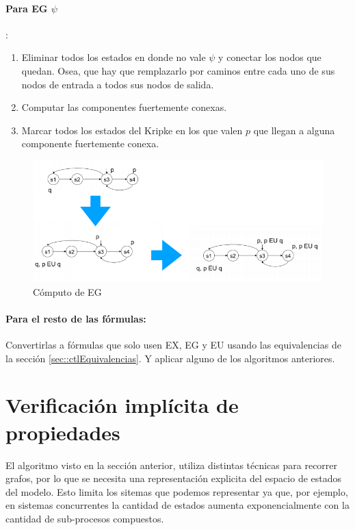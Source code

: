 \paragraph{Para EG $\psi$}: 
\begin{enumerate}
\item Eliminar todos los estados en donde no vale $\psi$ y conectar los nodos que quedan. Osea, que hay que remplazarlo por caminos entre cada uno de sus nodos de entrada a todos sus nodos de salida.
\item Computar las componentes fuertemente conexas.
\item Marcar todos los estados del Kripke en los que valen $p$ que llegan a alguna componente fuertemente conexa.
\end{enumerate}

\begin{figure}[h]
\centering
	\includegraphics[scale=0.5]{imagenes/computo-eu-explicito}
	\caption{Cómputo de EG}
\end{figure}

\paragraph{Para el resto de las fórmulas:} Convertirlas a fórmulas que solo usen EX, EG y EU usando las equivalencias de la sección \ref{sec::ctlEquivalencias}. Y aplicar alguno de los algoritmos anteriores.

\newpage
\section{Verificación implícita de propiedades}
El algoritmo visto en la sección anterior, utiliza distintas técnicas para recorrer grafos, por lo que se necesita una representación explicita del espacio de estados del modelo. Esto limita los sitemas que podemos representar ya que, por ejemplo, en sistemas concurrentes la cantidad de estados aumenta exponencialmente con la cantidad de sub-procesos compuestos.

